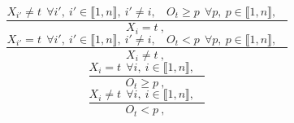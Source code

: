 $$\frac{X_{i'} \neq t~~\forall i',~i' \in \llbracket1,n\rrbracket,~i' \neq i,~~~~O_{t} \geq p~~\forall p,~p \in \llbracket1,n\rrbracket,~~~~}{X_{i}=t~,~}$$ $$\frac{X_{i'}=t~~\forall i',~i' \in \llbracket1,n\rrbracket,~i' \neq i,~~~~O_{t}<p~~\forall p,~p \in \llbracket1,n\rrbracket,~~~~}{X_{i} \neq t~,~}$$ $$\frac{X_{i}=t~~\forall i,~i \in \llbracket1,n\rrbracket,~~~~}{O_{t} \geq p~,~}$$ $$\frac{X_{i} \neq t~~\forall i,~i \in \llbracket1,n\rrbracket,~~~~}{O_{t}<p~,~}$$ 